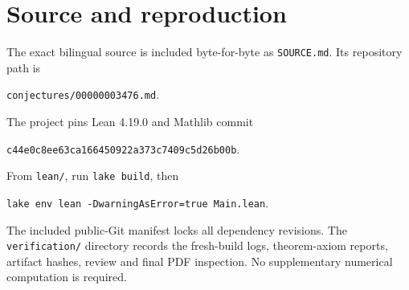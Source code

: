 \documentclass[11pt]{article}
\theoremstyle{remark}
\begin{document}
\section*{Source and reproduction}
The exact bilingual source is included byte-for-byte as
\texttt{SOURCE.md}. Its repository path is
\begin{center}\small\texttt{conjectures/00000003476.md}.\end{center}
The project pins Lean 4.19.0 and Mathlib commit
\begin{center}\small\texttt{c44e0c8ee63ca166450922a373c7409c5d26b00b}.\end{center}
From \texttt{lean/}, run \texttt{lake build}, then
\begin{center}\small\texttt{lake env lean -DwarningAsError=true Main.lean}.\end{center}
The included public-Git manifest locks all dependency revisions. The
\texttt{verification/} directory records the fresh-build logs,
theorem-axiom reports, artifact hashes, review and final PDF
inspection. No supplementary numerical computation is required.
\end{document}
